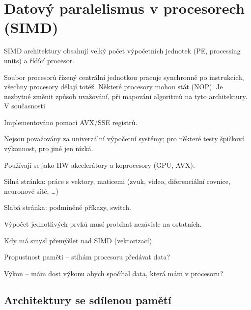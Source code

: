 
\section{Datový paralelismus v procesorech (SIMD)}

\begin{compactitem}
    \item SIMD architektury obsahují velký počet výpočetních jednotek (PE, processing units) a řídící procesor. \begin{compactitem}
        \item Soubor procesorů řízený centrální jednotkou pracuje synchronně po instrukcích, všechny procesory dělají totéž. Některé procesory mohou stát (NOP). Je nezbytné změnit způsob uvažování, při mapování algoritmů na tyto architektury. V současnosti
        \item Implementováno pomocí AVX/SSE registrů.
    \end{compactitem}

    \item Nejsou považovány za univerzální výpočetní systémy; pro
    některé testy špičková výkonnost, pro jiné jen nízká. \begin{compactitem}
        \item Používají se jako HW akcelerátory a koprocesory (GPU, AVX).
        \item Silná stránka: práce s vektory, maticemi (zvuk, video, diferenciální rovnice, neuronové sítě, \ldots)
        \item Slabá stránka: podmíněné příkazy, switch.
    \end{compactitem}

    \item Výpočet jednotlivých prvků musí probíhat nezávisle na
    ostatních.

    \item Kdy má smysl přemýšlet nad SIMD (vektorizací) \begin{compactitem}
        \item Propustnost paměti -- stíhám procesoru předávat data?
        \item Výkon -- mám dost výkonu abych spočítal data, která mám v procesoru?
    \end{compactitem}
\end{compactitem}

\subsection{Architektury se sdílenou pamětí}

